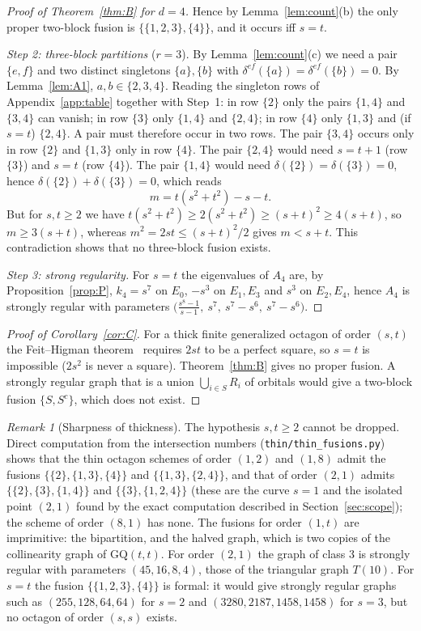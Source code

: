 \documentclass[11pt]{article}
\theoremstyle{remark}
\newtheorem{remark}[theorem]{Remark}
\begin{document}
\begin{proof}[Proof of Theorem~\ref{thm:B} for $d=4$]
Hence by Lemma~\ref{lem:count}(b) the only proper two-block fusion is $\{\{1,2,3\},\{4\}\}$, and it occurs iff $s=t$.

\smallskip\emph{Step 2: three-block partitions} ($r=3$). By Lemma~\ref{lem:count}(c) we need a pair $\{e,f\}$ and two distinct singletons $\{a\},\{b\}$ with $\delta^{ef}(\{a\})=\delta^{ef}(\{b\})=0$. By Lemma~\ref{lem:A1}, $a,b\in\{2,3,4\}$. Reading the singleton rows of Appendix~\ref{app:table} together with Step~1: in row $\{2\}$ only the pairs $\{1,4\}$ and $\{3,4\}$ can vanish; in row $\{3\}$ only $\{1,4\}$ and $\{2,4\}$; in row $\{4\}$ only $\{1,3\}$ and (if $s=t$) $\{2,4\}$. A pair must therefore occur in two rows. The pair $\{3,4\}$ occurs only in row $\{2\}$ and $\{1,3\}$ only in row $\{4\}$. The pair $\{2,4\}$ would need $s=t+1$ (row $\{3\}$) and $s=t$ (row $\{4\}$). The pair $\{1,4\}$ would need $\delta(\{2\})=\delta(\{3\})=0$, hence $\delta(\{2\})+\delta(\{3\})=0$, which reads
\[
m=t(s^2+t^2)-s-t .
\]
But for $s,t\ge2$ we have $t(s^2+t^2)\ge2(s^2+t^2)\ge(s+t)^2\ge4(s+t)$, so $m\ge3(s+t)$, whereas $m^2=2st\le(s+t)^2/2$ gives $m<s+t$. This contradiction shows that no three-block fusion exists.

\smallskip\emph{Step 3: strong regularity.} For $s=t$ the eigenvalues of $A_4$ are, by Proposition~\ref{prop:P}, $k_4=s^7$ on $E_0$, $-s^3$ on $E_1,E_3$ and $s^3$ on $E_2,E_4$, hence $A_4$ is strongly regular with parameters
$\bigl(\tfrac{s^8-1}{s-1},\ s^7,\ s^7-s^6,\ s^7-s^6\bigr)$.
\end{proof}

\begin{proof}[Proof of Corollary~\ref{cor:C}]
For a thick finite generalized octagon of order $(s,t)$ the Feit--Higman theorem~\cite{FH} requires $2st$ to be a perfect square, so $s=t$ is impossible ($2s^2$ is never a square). Theorem~\ref{thm:B} gives no proper fusion. A strongly regular graph that is a union $\bigcup_{i\in S}R_i$ of orbitals would give a two-block fusion $\{S,S^c\}$, which does not exist.
\end{proof}

\begin{remark}[Sharpness of thickness]\label{rem:sharp}
The hypothesis $s,t\ge2$ cannot be dropped. Direct computation from the intersection numbers (\texttt{thin/thin\_fusions.py}) shows that the thin octagon schemes of order $(1,2)$ and $(1,8)$ admit the fusions $\{\{2\},\{1,3\},\{4\}\}$ and $\{\{1,3\},\{2,4\}\}$, and that of order $(2,1)$ admits $\{\{2\},\{3\},\{1,4\}\}$ and $\{\{3\},\{1,2,4\}\}$ (these are the curve $s=1$ and the isolated point $(2,1)$ found by the exact computation described in Section~\ref{sec:scope}); the scheme of order $(8,1)$ has none. The fusions for order $(1,t)$ are imprimitive: the bipartition, and the halved graph, which is two copies of the collinearity graph of $\mathrm{GQ}(t,t)$. For order $(2,1)$ the graph of class $3$ is strongly regular with parameters $(45,16,8,4)$, those of the triangular graph $T(10)$. For $s=t$ the fusion $\{\{1,2,3\},\{4\}\}$ is formal: it would give strongly regular graphs such as $(255,128,64,64)$ for $s=2$ and $(3280,2187,1458,1458)$ for $s=3$, but no octagon of order $(s,s)$ exists.
\end{remark}
\end{document}
